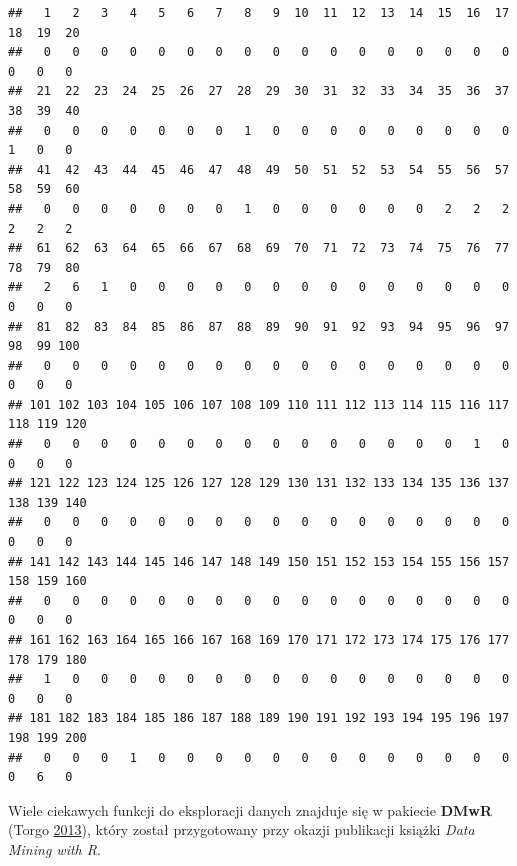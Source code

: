 \documentclass[
]{book}
\newenvironment{Shaded}{\begin{snugshade}}{\end{snugshade}}
\newcommand{\CommentTok}[1]{\textcolor[rgb]{0.56,0.35,0.01}{\textit{#1}}}
\newcommand{\KeywordTok}[1]{\textcolor[rgb]{0.13,0.29,0.53}{\textbf{#1}}}
\newcommand{\NormalTok}[1]{#1}
\theoremstyle{plain}
\theoremstyle{definition}
\theoremstyle{definition}
\theoremstyle{definition}
\theoremstyle{definition}
\theoremstyle{remark}
\begin{document}
\begin{verbatim}
##   1   2   3   4   5   6   7   8   9  10  11  12  13  14  15  16  17  18  19  20 
##   0   0   0   0   0   0   0   0   0   0   0   0   0   0   0   0   0   0   0   0 
##  21  22  23  24  25  26  27  28  29  30  31  32  33  34  35  36  37  38  39  40 
##   0   0   0   0   0   0   0   1   0   0   0   0   0   0   0   0   0   1   0   0 
##  41  42  43  44  45  46  47  48  49  50  51  52  53  54  55  56  57  58  59  60 
##   0   0   0   0   0   0   0   1   0   0   0   0   0   0   2   2   2   2   2   2 
##  61  62  63  64  65  66  67  68  69  70  71  72  73  74  75  76  77  78  79  80 
##   2   6   1   0   0   0   0   0   0   0   0   0   0   0   0   0   0   0   0   0 
##  81  82  83  84  85  86  87  88  89  90  91  92  93  94  95  96  97  98  99 100 
##   0   0   0   0   0   0   0   0   0   0   0   0   0   0   0   0   0   0   0   0 
## 101 102 103 104 105 106 107 108 109 110 111 112 113 114 115 116 117 118 119 120 
##   0   0   0   0   0   0   0   0   0   0   0   0   0   0   0   1   0   0   0   0 
## 121 122 123 124 125 126 127 128 129 130 131 132 133 134 135 136 137 138 139 140 
##   0   0   0   0   0   0   0   0   0   0   0   0   0   0   0   0   0   0   0   0 
## 141 142 143 144 145 146 147 148 149 150 151 152 153 154 155 156 157 158 159 160 
##   0   0   0   0   0   0   0   0   0   0   0   0   0   0   0   0   0   0   0   0 
## 161 162 163 164 165 166 167 168 169 170 171 172 173 174 175 176 177 178 179 180 
##   1   0   0   0   0   0   0   0   0   0   0   0   0   0   0   0   0   0   0   0 
## 181 182 183 184 185 186 187 188 189 190 191 192 193 194 195 196 197 198 199 200 
##   0   0   0   1   0   0   0   0   0   0   0   0   0   0   0   0   0   0   6   0
\end{verbatim}

Wiele ciekawych funkcji do eksploracji danych znajduje się w pakiecie \textbf{DMwR} (Torgo \protect\hyperlink{ref-R-DMwR}{2013}), który został przygotowany przy okazji publikacji książki \emph{Data Mining with R}.

\begin{Shaded}
\end{Shaded}
\end{document}
